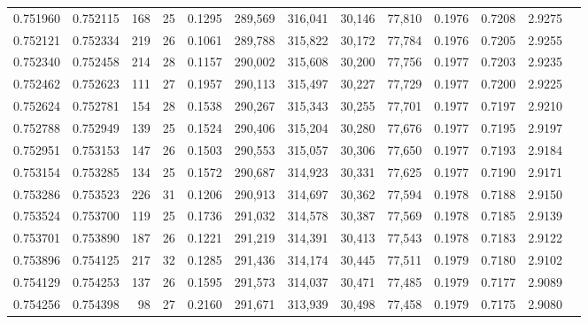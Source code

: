 \begin{tabular}{rrrrrrrrrrrrr}
0.751960 & 0.752115 &   168 &  25 &                                     0.1295 & 289,569 & 316,041 &  30,146 &  77,810 & 0.1976 & 0.7208 & 2.9275 \\
0.752121 & 0.752334 &   219 &  26 &                                     0.1061 & 289,788 & 315,822 &  30,172 &  77,784 & 0.1976 & 0.7205 & 2.9255 \\
0.752340 & 0.752458 &   214 &  28 &                                     0.1157 & 290,002 & 315,608 &  30,200 &  77,756 & 0.1977 & 0.7203 & 2.9235 \\
0.752462 & 0.752623 &   111 &  27 &                                     0.1957 & 290,113 & 315,497 &  30,227 &  77,729 & 0.1977 & 0.7200 & 2.9225 \\
0.752624 & 0.752781 &   154 &  28 &                                     0.1538 & 290,267 & 315,343 &  30,255 &  77,701 & 0.1977 & 0.7197 & 2.9210 \\
0.752788 & 0.752949 &   139 &  25 &                                     0.1524 & 290,406 & 315,204 &  30,280 &  77,676 & 0.1977 & 0.7195 & 2.9197 \\
0.752951 & 0.753153 &   147 &  26 &                                     0.1503 & 290,553 & 315,057 &  30,306 &  77,650 & 0.1977 & 0.7193 & 2.9184 \\
0.753154 & 0.753285 &   134 &  25 &                                     0.1572 & 290,687 & 314,923 &  30,331 &  77,625 & 0.1977 & 0.7190 & 2.9171 \\
0.753286 & 0.753523 &   226 &  31 &                                     0.1206 & 290,913 & 314,697 &  30,362 &  77,594 & 0.1978 & 0.7188 & 2.9150 \\
0.753524 & 0.753700 &   119 &  25 &                                     0.1736 & 291,032 & 314,578 &  30,387 &  77,569 & 0.1978 & 0.7185 & 2.9139 \\
0.753701 & 0.753890 &   187 &  26 &                                     0.1221 & 291,219 & 314,391 &  30,413 &  77,543 & 0.1978 & 0.7183 & 2.9122 \\
0.753896 & 0.754125 &   217 &  32 &                                     0.1285 & 291,436 & 314,174 &  30,445 &  77,511 & 0.1979 & 0.7180 & 2.9102 \\
0.754129 & 0.754253 &   137 &  26 &                                     0.1595 & 291,573 & 314,037 &  30,471 &  77,485 & 0.1979 & 0.7177 & 2.9089 \\
0.754256 & 0.754398 &    98 &  27 &                                     0.2160 & 291,671 & 313,939 &  30,498 &  77,458 & 0.1979 & 0.7175 & 2.9080 \\

\end{tabular}
